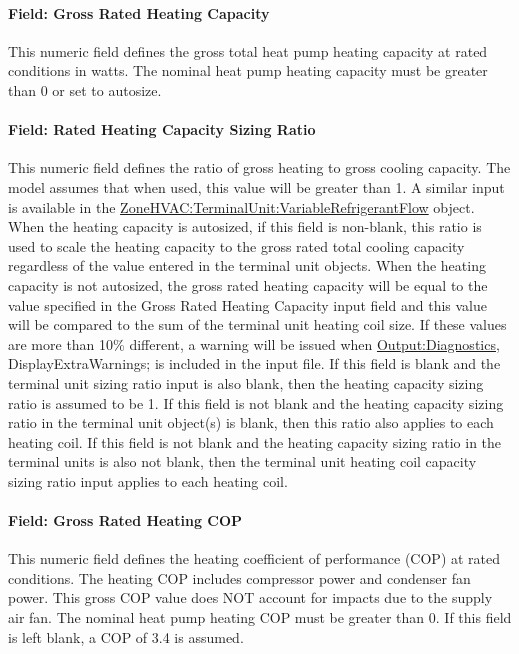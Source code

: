 \paragraph{Field: Gross Rated Heating Capacity}\label{field-gross-rated-heating-capacity-001}

This numeric field defines the gross total heat pump heating capacity at rated conditions in watts. The nominal heat pump heating capacity must be greater than 0 or set to autosize.

\paragraph{Field: Rated Heating Capacity Sizing Ratio}\label{field-rated-heating-capacity-sizing-ratio-000}

This numeric field defines the ratio of gross heating to gross cooling capacity. The model assumes that when used, this value will be greater than 1. A similar input is available in the \hyperref[zonehvacterminalunitvariablerefrigerantflow]{ZoneHVAC:TerminalUnit:VariableRefrigerantFlow} object. When the heating capacity is autosized, if this field is non-blank, this ratio is used to scale the heating capacity to the gross rated total cooling capacity regardless of the value entered in the terminal unit objects. When the heating capacity is not autosized, the gross rated heating capacity will be equal to the value specified in the Gross Rated Heating Capacity input field and this value will be compared to the sum of the terminal unit heating coil size. If these values are more than 10\% different, a warning will be issued when \hyperref[outputdiagnostics]{Output:Diagnostics}, DisplayExtraWarnings; is included in the input file. If this field is blank and the terminal unit sizing ratio input is also blank, then the heating capacity sizing ratio is assumed to be 1. If this field is not blank and the heating capacity sizing ratio in the terminal unit object(s) is blank, then this ratio also applies to each heating coil. If this field is not blank and the heating capacity sizing ratio in the terminal units is also not blank, then the terminal unit heating coil capacity sizing ratio input applies to each heating coil.

\paragraph{Field: Gross Rated Heating COP}\label{field-gross-rated-heating-cop-001}

This numeric field defines the heating coefficient of performance (COP) at rated conditions. The heating COP includes compressor power and condenser fan power. This gross COP value does NOT account for impacts due to the supply air fan. The nominal heat pump heating COP must be greater than 0. If this field is left blank, a COP of 3.4 is assumed.

